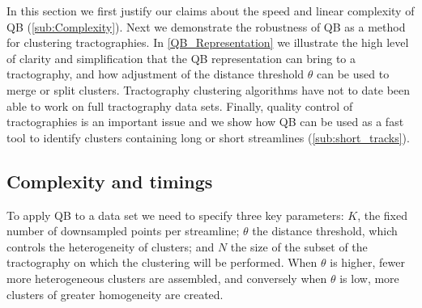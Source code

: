 \documentclass{bioinfo}
\begin{document}
In this section we first justify our claims about the speed and linear
complexity of QB (\ref{sub:Complexity}). Next we demonstrate the
robustness of QB as a method for clustering tractographies.  In
\ref{QB_Representation} we illustrate the high level of clarity and
simplification that the QB representation can bring to a tractography,
and how adjustment of the distance threshold $\theta$ can be used to
merge or split clusters.
Tractography clustering algorithms have not to date been able to work on
full tractography data sets. 
Finally, quality control of tractographies is an important issue and we
show how QB can be used as a fast tool to identify clusters containing
long or short streamlines (\ref{sub:short_tracks}).

\subsection{Complexity and timings\label{sub:Complexity}}

To apply QB to a data set we need to specify three key parameters: $K$,
the fixed number of downsampled points per streamline; $\theta$ the
distance threshold, which controls the heterogeneity of clusters; and
$N$ the size of the subset of the tractography on which the clustering
will be performed. When $\theta$ is higher, fewer more heterogeneous
clusters are assembled, and conversely when $\theta$ is low, more
clusters of greater homogeneity are created.
\end{document}
